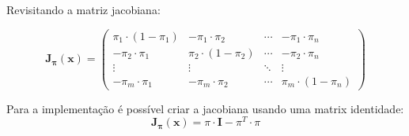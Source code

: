 \documentclass{article}
\begin{document}
Revisitando a matriz jacobiana:

\begin{equation*}
\mathbf{J_{\pi}}(\mathbf{x}) = 
\begin{pmatrix}
\pi_1 \cdot (1 - \pi_1) & - \pi_1 \cdot \pi_2 & \cdots & - \pi_1 \cdot \pi_n \\
- \pi_2 \cdot \pi_1 & \pi_2 \cdot (1 - \pi_2) & \cdots & - \pi_2 \cdot \pi_n \\
\vdots  & \vdots  & \ddots & \vdots  \\
- \pi_m \cdot \pi_1 & - \pi_m \cdot \pi_2 & \cdots & \pi_m \cdot (1 - \pi_n)
\end{pmatrix}
\end{equation*}

Para a implementação é possível criar a jacobiana usando uma matrix identidade:
\[ \mathbf{J_{\pi}}(\mathbf{x}) = \pi \cdot \mathbf{I} - \pi^{T} \cdot \pi \]
\end{document}
